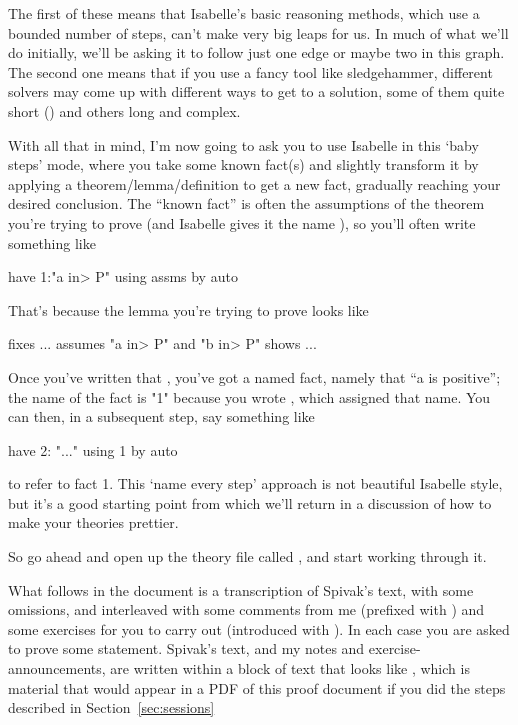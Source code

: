 The first of these means that Isabelle's basic reasoning methods, which use a bounded number of steps, can't make very big leaps for us. In much of what we'll do initially, we'll be asking it to follow just one edge or maybe two in this graph. The second one means that if you use a fancy tool like sledgehammer, different solvers may come up with different ways to get to a solution, some of them quite short () and others long and complex. 

With all that in mind, I'm now going to ask you to use Isabelle in this `baby steps' mode, where you take some known fact(s) and slightly transform it by applying a theorem/lemma/definition to get a new fact, gradually reaching your desired conclusion. The ``known fact'' is often the assumptions of the theorem you're trying to prove (and Isabelle gives it the name ), so you'll often write something like 
\begin{IS}
   have   1:"a \<in> P" using assms by auto 
\end{IS}

That's because the lemma you're trying to prove looks like
\begin{IS}
   fixes ...
   assumes "a \<in> P" and "b \<in> P"
   shows ...
\end{IS}
Once you've written that , you've got a named fact, namely that ``a is positive''; the name of the fact is "1" because you wrote , which assigned that name. You can then, in a subsequent step, say something like
\begin{IS}
   have 2: "..." using 1 by auto
\end{IS}
to refer to fact 1. This `name every step' approach is not beautiful Isabelle style, but it's a good starting point from which we'll return in a  discussion of how to make your theories prettier. 

So go ahead and open up the theory file called , and start working through it. 

What follows in the document is a transcription of Spivak's text, with some omissions, and interleaved with some comments from me (prefixed with ) and some exercises for you to carry out (introduced with ). In each case you are asked to prove some statement. Spivak's text, and my notes and exercise-announcements, are written within a block of text that looks like , which is material that would appear in a PDF of this proof document if you did the steps described in Section~\ref{sec:sessions} 

